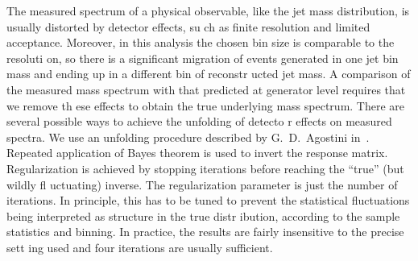 The measured spectrum of a physical observable, like the jet mass distribution, is usually distorted by	detector effects, su
ch as finite resolution and limited acceptance. Moreover, in this analysis the chosen bin size is comparable to the resoluti
on, so there is a significant migration of events generated in one jet bin mass and ending up in a different bin of reconstr
ucted jet mass. A comparison of the measured mass spectrum with that predicted at generator level requires that we remove th
ese effects to obtain the true underlying mass spectrum. There are several possible ways to achieve the unfolding of detecto
r effects on measured spectra. We use an unfolding procedure described by G.~D.~Agostini in~\cite{agostini}. Repeated application of Bayes theorem is used 
to invert the response matrix. Regularization is achieved by stopping iterations before reaching the ``true'' (but wildly fl
uctuating) inverse. The regularization parameter is just the number of iterations.
 In principle, this has to be tuned to prevent the statistical fluctuations being interpreted as structure in the true distr
ibution, according to the sample statistics and binning. In practice, the results are fairly insensitive to the precise sett
ing used and four iterations are usually sufficient.

